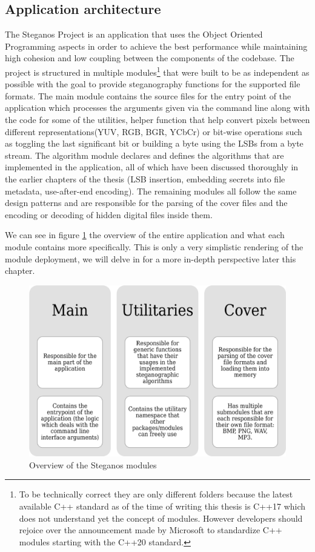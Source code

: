 \begin{multicols}{2}
\section{Application architecture}
The Steganos Project is an application that uses the Object Oriented Programming aspects in order to achieve the best performance while maintaining high cohesion and low coupling between the components of the codebase. The project is structured in multiple modules\footnote{To be technically correct they are only different folders because the latest available C++ standard as of the time of writing this thesis is C++17 which does not understand yet the concept of modules. However developers should rejoice over the announcement made by Microsoft to standardize C++ modules starting with the C++20 standard\cite{N4720}.} that were built to be as independent as possible with the goal to provide steganography functions for the supported file formats. The main module contains the source files for the entry point of the application which processes the arguments given via the command line along with the code for some of the utilities, helper function that help convert pixels between different representations(YUV, RGB, BGR, YCbCr) or bit-wise operations such as toggling the last significant bit or building a byte using the LSBs from a byte stream. The algorithm module declares and defines the algorithms that are implemented in the application, all of which have been discussed thoroughly in the earlier chapters of the thesis (LSB insertion, embedding secrets into file metadata, use-after-end encoding). The remaining modules all follow the same design patterns and are responsible for the parsing of the cover files and the encoding or decoding of hidden digital files inside them. 

We can see in figure \ref{module_overview} the overview of the entire application and what each module contains more specifically. This is only a very simplistic rendering of the module deployment, we will delve in for a more in-depth perspective later this chapter.
\end{multicols}

\begin{figure}[H]
    \centering
    \includegraphics[width=13cm,keepaspectratio]{pics/application_chapter/module_overview}
    \caption{Overview of the Steganos modules}
    \label{module_overview}
\end{figure}

